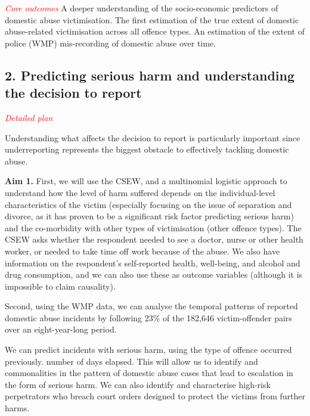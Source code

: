\documentclass[11pt, a4paper]{article}
\begin{document}




\textcolor{red}{\textit{Core outcomes}} 
A deeper understanding of the socio-economic predictors of domestic abuse victimisation. The first estimation of the true extent of domestic abuse-related victimisation across all offence types. An estimation of the extent of police (WMP) mis-recording of domestic abuse over time. 

\newpage


\subsection*{2. Predicting serious harm and understanding the decision to report}

\textcolor{red}{\textit{Detailed plan}}

Understanding what affects the decision to report is particularly important since underreporting represents the biggest obstacle to effectively tackling domestic abuse.

\textbf{Aim 1.} First, we will use the CSEW, and a multinomial logistic approach to understand how the level of harm suffered depends on the individual-level characteristics of the victim (especially focusing on the issue of separation and divorce, as it has proven to be a significant risk factor predicting serious harm) and the co-morbidity with other types of victimisation (other offence types). The CSEW asks whether the respondent needed to see a doctor, nurse or other health worker, or needed to take time off work because of the abuse. We also have information on the respondent's self-reported health, well-being, and alcohol and drug consumption, and we can also use these as outcome variables (although it is impossible to claim causality).

Second, using the WMP data, we can analyse the temporal patterns of reported domestic abuse incidents by following  23\% of the 182,646 victim-offender pairs over an eight-year-long period. 

We can predict incidents with serious harm, using the type of offence occurred previously. number of days elapsed. This will allow us to identify and commonalities in the pattern of domestic abuse cases that lead to escalation in the form of serious harm. We can also identify and characterise high-risk perpetrators who breach court orders designed to protect the victims from further harms.
\end{document}
